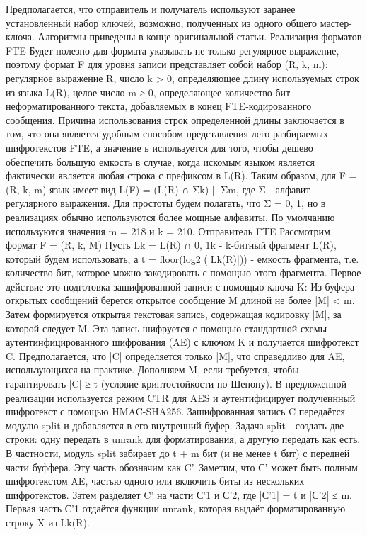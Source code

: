 Предполагается, что отправитель и получатель используют заранее установленный набор ключей, возможно, полученных из одного общего мастер-ключа.
Алгоритмы приведены в конце оригинальной статьи.
Реализация форматов FTE
Будет полезно для формата указывать не только регулярное выражение, поэтому формат F для уровня записи представляет собой набор (R, k, m):
регулярное выражение R,
число k > 0, определяющее длину используемых строк из языка L(R),
целое число m ≥ 0, определяющее количество бит неформатированного текста, добавляемых в конец FTE-кодированного сообщения.
Причина использования строк определенной длины заключается в том, что она является удобным способом представления лего разбираемых шифротекстов FTE, а значение ь используется для того, чтобы дешево обеспечить большую емкость в случае, когда искомым языком является фактически является любая строка с префиксом в L(R).
Таким образом, для F = (R, k, m) язык имеет вид L(F) = (L(R) ∩ Σk) || Σm, где Σ - алфавит регулярного выражения.
Для простоты будем полагать, что Σ = {0, 1}, но в реализациях обычно используются более мощные алфавиты. По умолчанию используются значения m = 218 и k = 210.
Отправитель FTE
Рассмотрим формат F = (R, k, M)
Пусть Lk = L(R) ∩ {0, 1}k - k-битный фрагмент L(R), который будем использовать, а t = floor(log2 (|Lk(R)|)) - емкость фрагмента, т.е. количество бит, которое можно закодировать с помощью этого фрагмента.
Первое действие это подготовка зашифрованной записи с помощью ключа K:
Из буфера открытых сообщений берется открытое сообщение M длиной не более |M| < m.
Затем формируется открытая текстовая запись, содержащая кодировку |M|, за которой следует M.
Эта запись шифруется с помощью стандартной схемы аутентинфицированного шифрования (AE) с ключом K и получается шифротекст C. Предполагается, что |C| определяется только |M|, что справедливо для AE, использующихся на практике.
Дополняем M, если требуется, чтобы гарантировать |C| ≥ t (условие криптостойкости по Шенону).
В предложенной реализации используется режим CTR для AES и аутентифицирует полученнный шифротекст с помощью HMAC-SHA256.
Зашифрованная запись C передаётся модулю split и добавляется в его внутренний буфер.
Задача split - создать две строки: одну передать в unrank для форматирования, а другую передать как есть.
В частности, модуль split забирает до t + m бит (и не менее t бит) с передней части буффера. Эту часть обозначим как C'. Заметим, что С' может быть полным шифротекстом AE, частью одного или включить биты из нескольких шифротекстов. Затем разделяет C' на части С'1 и С'2, где |С'1| = t и |С'2| ≤ m.
Первая часть С'1 отдаётся функции unrank, которая выдаёт форматированную строку X из Lk(R).
